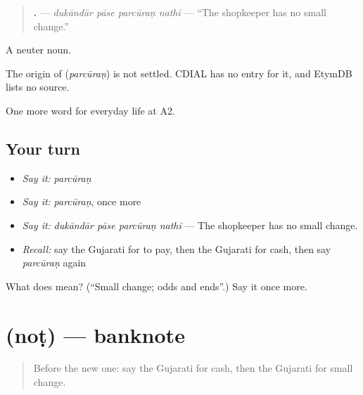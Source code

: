 \begin{quote}
\textbf{   .} — \emph{dukāndār pāse parcūraṇ nathī} — \textquotedblleft{}The shopkeeper has no small change.\textquotedblright{}
\end{quote}

A neuter noun.

\begin{cousinweb}
The origin of \textbf{} (\emph{parcūraṇ}) is not settled. CDIAL has no entry for it, and EtymDB lists no source.
\end{cousinweb}

\begin{grammarlens}[title={What you've built}]
One more word for everyday life at A2.
\end{grammarlens}

\subsection*{Your turn}
\begin{itemize}
\raggedright
  \item \emph{Say it:} \emph{parcūraṇ}
  \item \emph{Say it:} \emph{parcūraṇ}, once more
  \item \emph{Say it:} \emph{dukāndār pāse parcūraṇ nathī} — The shopkeeper has no small change.
  \item \emph{Recall:} say the Gujarati for to pay, then the Gujarati for cash, then say \emph{parcūraṇ} again
\end{itemize}

\begin{tcolorbox}[breakable,colback=teal!4,colframe=teal!35!black,title={Before you move on}]
What does  mean? (\textquotedblleft{}Small change; odds and ends\textquotedblright{}.) Say it once more.
\end{tcolorbox}
\section[\texorpdfstring{\gu{નોટ} (noṭ)}{નોટ (noṭ)}]{ (noṭ) — banknote}

\label{lesson:GU-C186-not}



\begin{quote}
Before the new one: say the Gujarati for cash, then the Gujarati for small change.
\end{quote}

